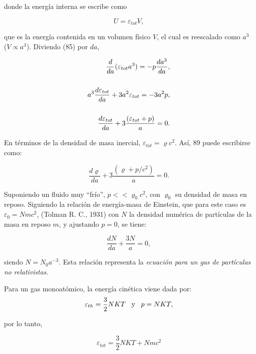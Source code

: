 \documentclass[11pt]{article}
\begin{document}
    donde la energía interna se escribe como 
    
    \begin{equation}
        U = \varepsilon_{tot} V,
    \end{equation}
    
    que es la energía contenida en un volumen físico $V$, el cual es reescalado como $a^3$ ($V \propto a^3$). 
    Diviendo (85) por $da$,
    
    \begin{align}
        \frac{d}{da}( \varepsilon_{tot} a^3)  = -p \frac{da^3}{da}, \\
        \notag \\
        a^3 \frac{d\varepsilon_{tot}}{da} + 3 a^2 \varepsilon_{tot} = - 3 a^2p,     \notag \\
        \notag \\
        \frac{d\varepsilon_{tot}}{da}+ 3 \frac{( \varepsilon_{tot} + p)}{a}  = 0.
    \end{align}
    
    En términos de la densidad de masa inercial, $\varepsilon_{tot}= \varrho c^2$. Así, 89 puede escribirse como: 
    
    \begin{equation}
         \frac{d\varrho}{da} + 3 \frac{(\varrho + p/c^2)}{a} = 0.
    \end{equation}
    
    Suponiendo un fluido muy ``frío'', $p << \varrho_0 c^2$, con $\varrho_0$ su densidad de masa en reposo. Siguiendo la relación de energía-masa de Einstein, que para este caso es $\varepsilon_0 =Nm c^2$, (Tolman R. C., 1931) con $N$ la densidad numérica de partículas de la masa en reposo $m$, y ajustando $p=0$, se tiene: 
    
    \begin{equation}
        \frac{dN}{da} + \frac{3N}{a} = 0, 
    \end{equation}
    
    siendo $N = N_0 a^{-3}$. Esta relación representa la {\textit{ecuación para un gas de partículas no relativistas}}. 
    
    Para un gas monoatómico, la energía cinética viene dada por: $$\varepsilon_{th} = \frac{3}{2} NKT  \hspace{0.3cm} \text{y} \hspace{0.3cm} p = NKT,$$
    
    por lo tanto,
    
    $$\varepsilon_{tot} = \frac{3}{2} NKT + Nmc^2$$
    
\end{document}
